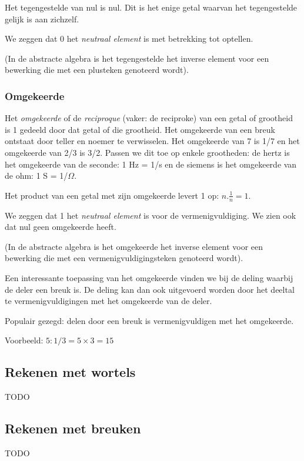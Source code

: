 \noindent Het tegengestelde van nul is nul. Dit is het enige getal
waarvan het tegengestelde gelijk is aan zichzelf. 

\noindent We zeggen dat 0 het \emph{neutraal element} is met betrekking
tot optellen.

\noindent (In de abstracte algebra is het tegengestelde het inverse
element voor een bewerking die met een plusteken genoteerd wordt).

\bigskip{}

\subsubsection{Omgekeerde}

\noindent Het \emph{omgekeerde} of de \emph{reciproque} (vaker: de
reciproke) van een getal of grootheid is 1 gedeeld door dat getal
of die grootheid. Het omgekeerde van een breuk ontstaat door teller
en noemer te verwisselen. Het omgekeerde van 7 is 1/7 en het omgekeerde
van 2/3 is 3/2. Passen we dit toe op enkele grootheden: de hertz is
het omgekeerde van de seconde: 1 Hz = 1/s en de siemens is het omgekeerde
van de ohm: 1 S = 1/$\Omega$.

\noindent Het product van een getal met zijn omgekeerde levert 1 op:
${\displaystyle n.\frac{1}{n}=1}$. 

\noindent We zeggen dat 1 het \emph{neutraal element} is voor de vermenigvuldiging.
We zien ook dat nul geen omgekeerde heeft.

\noindent (In de abstracte algebra is het omgekeerde het inverse element
voor een bewerking die met een vermenigvuldigingsteken genoteerd wordt).

\medskip{}


\noindent Een interessante toepassing van het omgekeerde vinden we
bij de deling waarbij de deler een breuk is. De deling kan dan ook
uitgevoerd worden door het deeltal te vermenigvuldigingen met het
omgekeerde van de deler. 

\noindent Populair gezegd: delen door een breuk is vermenigvuldigen
met het omgekeerde.

\noindent Voorbeeld: $5:1/3=5\times3=15$ 


\subsection{Rekenen met wortels}
TODO


\subsection{Rekenen met breuken}
TODO

